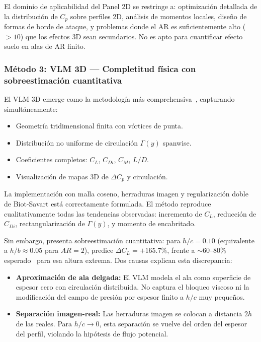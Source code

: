 \documentclass[twocolumn]{article}
\begin{document}
El dominio de aplicabilidad del Panel 2D se restringe a: optimización detallada de la distribución de $C_p$ sobre perfiles 2D, análisis de momentos locales, diseño de formas de borde de ataque, y problemas donde el AR es suficientemente alto ($> 10$) que los efectos 3D sean secundarios. No es apto para cuantificar efecto suelo en alas de AR finito.

\subsubsection{Método 3: VLM 3D --- Completitud física con sobreestimación cuantitativa}

El VLM 3D emerge como la metodología más comprehensiva~\cite{katz2001}, capturando simultáneamente:

\begin{itemize}
    \item Geometría tridimensional finita con vórtices de punta.
    \item Distribución no uniforme de circulación $\Gamma(y)$ spanwise.
    \item Coeficientes completos: $C_L$, $C_{Di}$, $C_M$, $L/D$.
    \item Visualización de mapas 3D de $\Delta C_p$ y circulación.
\end{itemize}

La implementación con malla coseno, herraduras imagen y regularización doble de Biot-Savart está correctamente formulada. El método reproduce cualitativamente todas las tendencias observadas: incremento de $C_L$, reducción de $C_{Di}$, rectangularización de $\Gamma(y)$, y momento de encabritado.

Sin embargo, presenta sobreestimación cuantitativa: para $h/c = 0.10$ (equivalente a $h/b \approx 0.05$ para $AR = 2$), predice $\Delta C_L = +165.7\%$, frente a $\sim 60$--80\% esperado~\cite{zerihan2000} para esa altura extrema. Dos causas explican esta discrepancia:

\begin{itemize}
    \item \textbf{Aproximación de ala delgada:} El VLM modela el ala como superficie de espesor cero con circulación distribuida. No captura el bloqueo viscoso ni la modificación del campo de presión por espesor finito a $h/c$ muy pequeños.
    \item \textbf{Separación imagen-real:} Las herraduras imagen se colocan a distancia $2h$ de las reales. Para $h/c \to 0$, esta separación se vuelve del orden del espesor del perfil, violando la hipótesis de flujo potencial.
\end{itemize}
\end{document}
